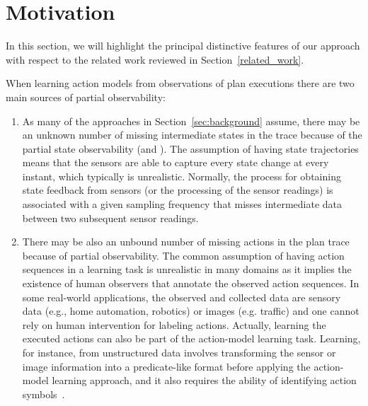 
\section{Motivation}
\label{sec:motivation}

In this section, we will highlight the principal distinctive features of our approach \FAMA with respect to the related work reviewed in Section~\ref{related_work}.

\vspace{0.1cm}

When learning action models from observations of plan executions there are two main sources of partial observability:
\begin{enumerate}
\item As many of the approaches in Section~\ref{sec:background} assume, there may be an unknown number of missing intermediate states in the trace because of the partial state observability (\PO and \NO). The assumption of having \FO state trajectories means that the sensors are able to capture every state change at every instant, which typically is unrealistic. Normally, the process for obtaining state feedback from sensors (or the processing of the sensor readings) is associated with a given sampling frequency that misses intermediate data between two subsequent sensor readings.

\item There may be also an unbound number of missing actions in the plan trace because of partial observability. The common assumption of having \FO action sequences in a learning task is unrealistic in many domains as it implies the existence of human observers that annotate the observed action sequences. In some real-world applications, the observed and collected data are sensory data (e.g., home automation, robotics) or images (e.g. traffic) and one cannot rely on human intervention for labeling actions. Actually, learning the executed actions can also be part of the action-model learning task. Learning, for instance, from unstructured data involves transforming the sensor or image information into a predicate-like format before applying the action-model learning approach, and it also requires the ability of identifying action symbols~\cite{AsaiF18}.
\end{enumerate}


